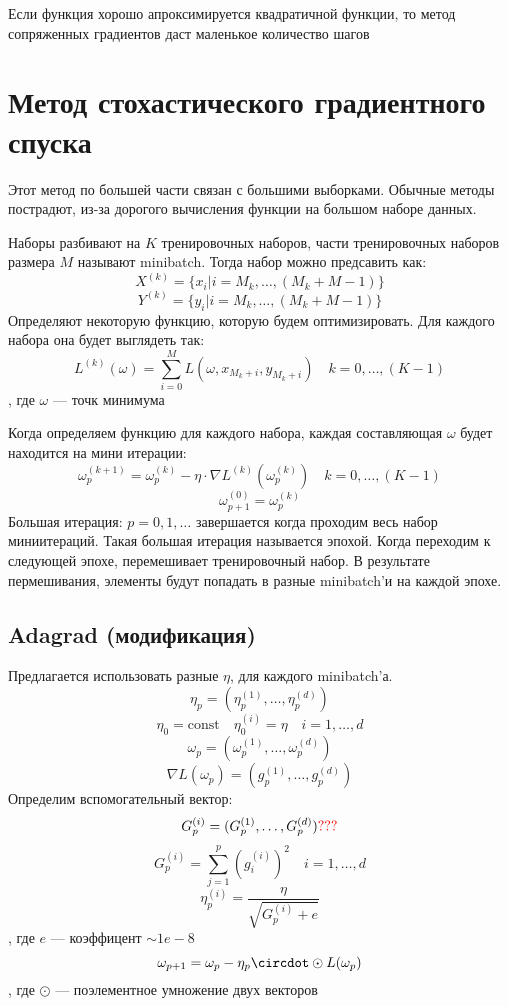\documentclass[english]{article}
\newcommand{\const}{\text{const}}
\theoremstyle{plain}
\theoremstyle{remark}
\theoremstyle{definition}
\begin{document}
Если функция хорошо апроксимируется квадратичной функции, то метод сопряженных градиентов даст маленькое количество шагов
\section{Метод стохастического градиентного спуска}
\label{sec:orgdc3ac6e}
Этот метод по большей части связан с большими выборками. Обычные методы пострадют, из-за дорогого вычисления функции на большом наборе данных.

Наборы разбивают на \(K\) тренировочных наборов, части тренировочных наборов размера \(M\) называют minibatch. Тогда набор можно предсавить как:
\[ X^{(k)} = \{x_i | i = M_k,\dots,(M_k + M - 1)\} \]
\[ Y^{(k)} = \{y_i | i = M_k,\dots,(M_k + M - 1)\} \]
Определяют некоторую функцию, которую будем оптимизировать. Для каждого набора она будет выглядеть так:
\[ L^{(k)}(\omega) = \sum_{i = 0}^M L(\omega, x_{M_k + i}, y_{M_k + i}) \quad k = 0,\dots,(K - 1)\]
, где \(\omega\) --- точк минимума

Когда определяем функцию для каждого набора, каждая составляющая \(\omega\) будет находится на мини итерации:
\[ \omega_p^{(k + 1)} = \omega_p^{(k)} - \eta \cdot \nabla L^{(k)}(\omega_p^{(k)}) \quad k = 0,\dots,(K - 1)\]
\[ \omega^{(0)}_{p + 1} = \omega^{(k)}_p \]
Большая итерация: \(p = 0,1,\dots\) завершается когда проходим весь набор миниитераций. Такая большая итерация называется эпохой. Когда переходим к следующей эпохе, перемешивает тренировочный набор. В результате пермешивания, элементы будут попадать в разные minibatch'и на каждой эпохе.

\subsection{Adagrad (модификация)}
\label{sec:orgf6dfe13}
Предлагается использовать разные \(\eta\), для каждого minibatch'а.
\[ \eta_p = (\eta^{(1)}_p,\dots,\eta_p^{(d)}) \]
\[ \eta_0 = \const \quad \eta^{(i)}_0 = \eta \quad i = 1,\dots,d\]
\[ \omega_p = (\omega^{(1)}_p,\dots,\omega^{(d)}_p) \]
\[ \nabla L(\omega_p) = (g^{(1)}_p,\dots,g^{(d)}_p) \]
Определим вспомогательный вектор:
\[ G^{(i)}_p = (G^{(1)}_p,\dots,G^{(d)}_p) \color{red}???\color{black} \]
\[ G^{(i)}_p = \sum_{j = 1}^p (g_i^{(i)})^2 \quad i = 1,\dots,d\]
\[ \eta_p^{(i)} = \frac{\eta}{\sqrt{G^{(i)}_p + e}} \]
, где \(e\) --- коэффицент \(\sim 1e-8\)
\[ \omega_{p + 1} = \omega_p - \eta_p \circdot \odot L(\omega_p) \], где \(\odot\) --- поэлементное умножение двух векторов
\end{document}
